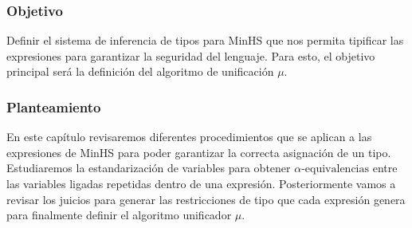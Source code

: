 \subsubsection{Objetivo}
Definir el sistema de inferencia de tipos para \textsf{MinHS} que nos permita tipificar las expresiones para garantizar la seguridad del lenguaje. Para esto, el objetivo principal será la definición del algoritmo de unificación \textbf{$\mu$}.


\subsubsection{Planteamiento}
En este capítulo  revisaremos diferentes  procedimientos que se aplican a las expresiones de \textsf{MinHS} para poder garantizar la correcta  asignación de un tipo.
Estudiaremos la estandarización de variables para obtener $\alpha\text{-equivalencias}$ entre las variables ligadas repetidas dentro de una expresión.
Posteriormente vamos a revisar los juicios para generar las restricciones de tipo que cada expresión genera para finalmente definir el algoritmo unificador $\mu$.


